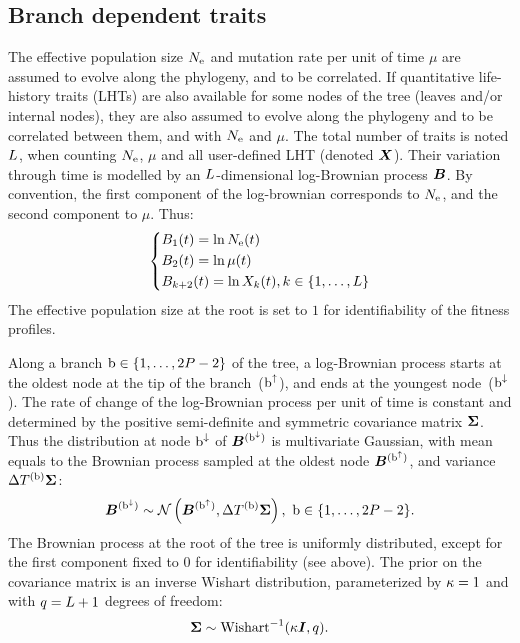 \documentclass{article}
\begin{document}
    \subsection{Branch dependent traits}
    The {effective population size} $N_{\text{e}}$ and mutation rate per unit of time $\mu$ are assumed to evolve along the phylogeny, and to be correlated.
    If quantitative life-history traits ({LHT}s) are also available for some nodes of the tree (leaves and/or internal nodes), they are also assumed to evolve along the phylogeny and to be correlated between them, and with $N_{\text{e}}$ and $\mu$.
    The total number of traits is noted $L$, when counting $N_{\text{e}}$, $\mu$ and all user-defined LHT (denoted $\bm{X}$).
    Their variation through time is modelled by an $L$-dimensional log-Brownian process $\bm{B}$.
    By convention, the first component of the log-brownian corresponds to $N_{\text{e}}$, and the second component to $\mu$.
    Thus:
    \begin{equation}
        \begin{dcases}
            B_1 (t) = \ln N_{\text{e}} (t) \\
            B_2 (t) = \ln \mu (t) \\
            B_{k+2}(t) = \ln X_k(t), k \in \{1, \hdots, L\}
        \end{dcases}
    \end{equation}
    The effective population size at the root is set to $1$ for identifiability of the fitness profiles.

    Along a branch $\text{b} \in \{1, \hdots, 2 P - 2\}$ of the tree, a log-Brownian process starts at the oldest node at the tip of the branch~($\text{b}^{\uparrow}$), and ends at the youngest node~($\text{b}^{\downarrow}$).
    The rate of change of the log-Brownian process per unit of time is constant and determined by the positive semi-definite and symmetric covariance matrix $\bm{\Sigma}$. Thus the distribution at node $\text{b}^{\downarrow}$ of $\bm{B}^{(\text{b}^{\downarrow})}$ is multivariate Gaussian, with mean equals to the Brownian process sampled at the oldest node $\bm{B}^{(\text{b}^{\uparrow})}$, and variance $\Delta T^{(\text{b})} \bm{\Sigma}$:
    \begin{equation}
        \label{eq:DistribBrownian}
        \bm{B}^{(\text{b}^{\downarrow})} \sim \mathcal{N}\left(\bm{B}^{(\text{b}^{\uparrow})}, \Delta T^{(\text{b})} \bm{\Sigma} \right),\ \text{b} \in \{1, \hdots, 2 P - 2\}.
    \end{equation}
    The Brownian process at the root of the tree is uniformly distributed, except for the first component fixed to $0$ for identifiability (see above).
    The {prior} on the covariance matrix is an inverse Wishart distribution, parameterized by $\kappa=1$ and with $q=L + 1$ degrees of freedom:
    \begin{equation}
        \label{eq:Distribcovariance}
        \bm{\Sigma} \sim \text{Wishart}^{-1} (\kappa \bm{I}, q).
    \end{equation}
\end{document}
